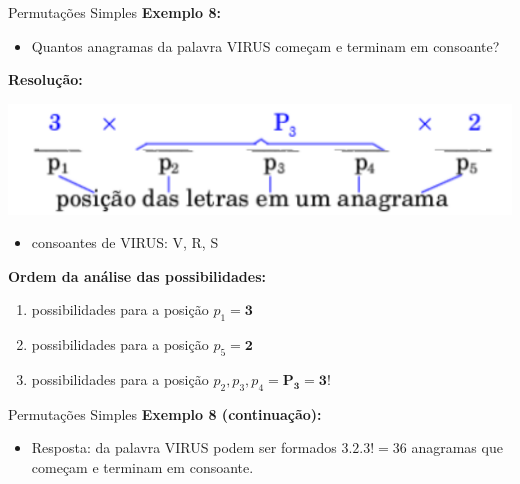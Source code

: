 \documentclass[aspectratio=169]{beamer}
\begin{document}
\begin{frame}{Permutações Simples}
    \textbf{Exemplo 8:}

    \vspace{2mm}

    \begin{itemize}
        \item[] Quantos anagramas da palavra VIRUS começam e terminam em consoante?
    \end{itemize}

    \textbf{Resolução:}

    \begin{center}
        \includegraphics[width=0.5\linewidth]{figs/Exemplo8_1.png}
    \end{center}

    
    \begin{itemize}
        \item consoantes de VIRUS: V, R, S
    \end{itemize}

    
    \textbf{Ordem da análise das possibilidades:}
    \begin{enumerate}[1)]
        \item possibilidades para a posição $p_1 = \boldsymbol{3}$ 
        \item possibilidades para a posição $p_5 = \boldsymbol{2}$ 
        \item possibilidades para a posição $p_2, p_3, p_4 = \boldsymbol{P_3 = 3!} $
    \end{enumerate}

\end{frame}

\begin{frame}{Permutações Simples}
    \textbf{Exemplo 8 (continuação):}

    \vspace{4mm}

    \begin{itemize}
        \item[] Resposta: da palavra VIRUS podem ser formados $3 . 2 . 3! = 36$ anagramas que começam e terminam em consoante.
    \end{itemize}
\end{frame}
\end{document}
